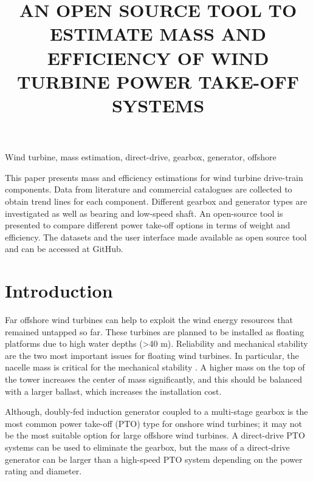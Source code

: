 \documentclass{article}\usepackage{graphicx, color}
\begin{document}
\title{AN OPEN SOURCE TOOL TO ESTIMATE MASS AND EFFICIENCY OF WIND TURBINE POWER TAKE-OFF SYSTEMS}


\maketitle

\keywords
Wind turbine, mass estimation, direct-drive, gearbox, generator, offshore

\abstract

This paper presents mass and efficiency estimations for wind turbine drive-train components. Data from literature and commercial catalogues are collected to obtain trend lines for each component. Different gearbox and generator types are investigated as well as bearing and low-speed shaft. An open-source tool is presented to compare different power take-off options in terms of weight and efficiency. The datasets and the user interface made available as open source tool and can be accessed at GitHub.

\section{Introduction}

Far offshore wind turbines can help to exploit the wind energy resources that remained untapped so far. These turbines are planned to be installed as floating platforms due to  high water depths (\textgreater 40 m). Reliability and mechanical stability are the two most important issues for floating wind turbines. In particular, the nacelle mass is critical for the mechanical stability \cite{Christiansen2011, Sethuraman2013}. A higher mass on the top of the tower increases the center of mass significantly, and this should be balanced with a larger ballast, which increases the installation cost. 

Although, doubly-fed induction generator coupled to a multi-stage gearbox is the most common power take-off (PTO) type for onshore wind turbines; it may not be the most suitable option for large offshore wind turbines. A direct-drive PTO systems can be used to eliminate the gearbox, but the mass of a direct-drive generator can be larger than a high-speed PTO system depending on the power rating and diameter.
\end{document}
